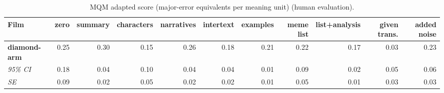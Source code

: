 \begin{table}[ht]
\centering
\begin{adjustbox}{width=\textwidth}
\begin{tabular}{lrrrrrrrrr|r}
Film & zero & summary & characters & narratives & intertext & examples & meme list & list+analysis & given trans. & added noise \\
\hline
\textbf{diamond-arm} & 0.25 & 0.30 & 0.15 & 0.26 & 0.18 & 0.21 & 0.22 & 0.17 & 0.03 & 0.23 \\

\emph{95\% CI} & 0.18 & 0.04 & 0.10 & 0.04 & 0.04 & 0.01 & 0.09 & 0.02 & 0.05 & 0.06 \\

\emph{SE} & 0.09 & 0.02 & 0.05 & 0.02 & 0.02 & 0.01 & 0.05 & 0.01 & 0.03 & 0.03 \\

\hline
\end{tabular}
\end{adjustbox}
\caption{MQM adapted score (major-error equivalents per meaning unit) (human evaluation).}
\label{tab:mqm-method-comparison-human}
\end{table}
